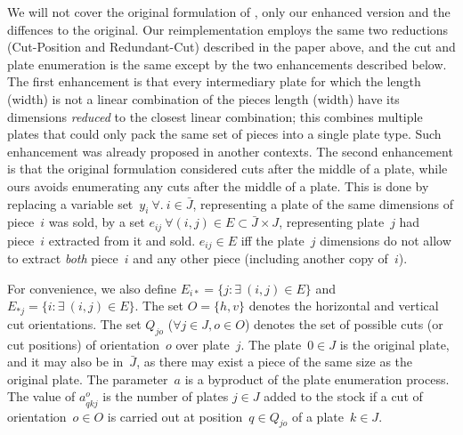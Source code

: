 \documentclass[9pt]{entcs}
\begin{document}
We will not cover the original formulation of \cite{furini:2016}, only our enhanced version and the diffences to the original.
Our reimplementation employs the same two reductions (Cut-Position and Redundant-Cut) described in the paper above, and the cut and plate enumeration is the same except by the two enhancements described below.
The first enhancement is that every intermediary plate for which the length (width) is not a linear combination of the pieces length (width) have its dimensions \emph{reduced} to the closest linear combination; this combines multiple plates that could only pack the same set of pieces into a single plate type.
Such enhancement was already proposed in another contexts\cite{alvarez:2009,dolatabadi:2012}.
The second enhancement is that the original formulation considered cuts after the middle of a plate, while ours avoids enumerating any cuts after the middle of a plate.
This is done by replacing a variable set~\(y_i~\forall.~i \in \bar{J}\), representing a plate of the same dimensions of piece~\(i\) was sold, by a set \(e_{ij}~\forall (i, j) \in E \subset \bar{J} \times J\), representing plate~\(j\) had piece~\(i\) extracted from it and sold.
\(e_{ij} \in E\) iff the plate~\(j\) dimensions do not allow to extract \emph{both} piece~\(i\) and any other piece (including another copy of~\(i\)).

For convenience, we also define \(E_{i*} = \{ j : \exists~(i, j) \in E \}\) and \(E_{*j} = \{i : \exists~(i, j) \in E \}\).
The set \(O = \{h, v\}\) denotes the horizontal and vertical cut orientations.
The set \(Q_{jo}\) (\(\forall j \in J, o \in O\)) denotes the set of possible cuts (or cut positions) of orientation~\(o\) over plate~\(j\).
The plate~\(0 \in J\) is the original plate, and it may also be in~\(\bar{J}\), as there may exist a piece of the same size as the original plate.
The parameter~\(a\) is a byproduct of the plate enumeration process.
The value of \(a^o_{qkj}\) is the number of plates \(j \in J\) added to the stock if a cut of orientation~\(o \in O\) is carried out at position~\(q \in Q_{jo}\) of a plate~\(k \in J\).
\end{document}
